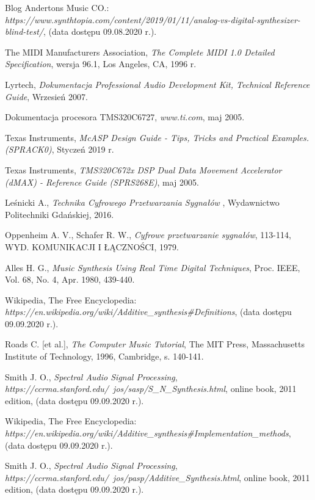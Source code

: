 \documentclass[nostrict]{szablonPG}
\begin{document}
\begin{thebibliography}{20}
		Blog Andertons Music CO.: \emph{https://www.synthtopia.com/content/2019/01/11/analog-vs-digital-synthesizer-blind-test/}, (data dostępu 09.08.2020 r.).
	
		The MIDI Manufacturers Association, \emph{The Complete MIDI 1.0 Detailed Specification}, wersja 96.1, Los Angeles, CA, 1996 r.
		
		Lyrtech, \emph{Dokumentacja Professional Audio Development Kit, Technical Reference Guide}, Wrzesień 2007.
		
		Dokumentacja procesora TMS320C6727, \emph{www.ti.com}, maj 2005.
		
	    Texas Instruments, \emph{McASP Design Guide - Tips, Tricks and Practical Examples. (SPRACK0)}, Styczeń 2019 r.
		
		Texas Instruments, \emph{TMS320C672x DSP Dual Data Movement Accelerator (dMAX) - Reference Guide (SPRS268E)}, maj 2005.
		
		Le\'snicki A., \emph{Technika Cyfrowego Przetwarzania Sygna\l{}\'ow }, Wydawnictwo Politechniki Gda\'nskiej, 2016.
		
		Oppenheim A. V., Schafer R. W., \emph{Cyfrowe przetwarzanie sygnałów}, 113-114, WYD. KOMUNIKACJI I ŁĄCZNOŚCI, 1979.
		
		Alles H. G., \emph{Music Synthesis Using Real Time Digital Techniques}, Proc. IEEE, Vol. 68, No. 4, Apr. 1980, 439-440.

		Wikipedia, The Free Encyclopedia: \emph{https://en.wikipedia.org/wiki/Additive\_synthesis\#Definitions}, (data dostępu 09.09.2020 r.).
		
		Roads C. [et al.], \emph{The Computer Music Tutorial}, The MIT Press, Massachusetts Institute of Technology, 1996, Cambridge, s. 140-141.
		
		Smith J. O., \emph{Spectral Audio Signal Processing}, \emph{https://ccrma.stanford.edu/~jos/sasp/S\_N\_Synthesis.html}, online book, 2011 edition, (data dostępu 09.09.2020 r.).
		
		Wikipedia, The Free Encyclopedia:
		\emph{https://en.wikipedia.org/wiki/Additive\_synthesis\#Implementation\_methods}, (data dostępu 09.09.2020 r.).
		
		Smith J. O., \emph{Spectral Audio Signal Processing}, \emph{https://ccrma.stanford.edu/~jos/pasp/Additive\_Synthesis.html}, online book, 2011 edition, (data dostępu 09.09.2020 r.).
		

\end{thebibliography}
\end{document}
